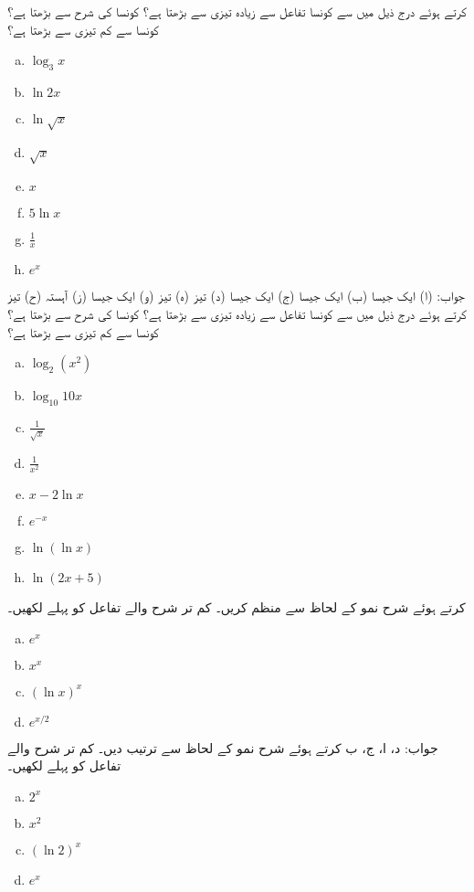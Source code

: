  کرتے ہوئے درج ذیل میں سے کونسا تفاعل  سے زیادہ تیزی سے بڑھتا ہے؟ کونسا  کی شرح سے بڑھتا ہے؟  کونسا  سے کم تیزی سے بڑھتا ہے؟
\begin{multicols}{4}
\begin{enumerate}[a.]
\item
$\log_3x$
\item
$\ln 2x$
\item
$\ln \sqrt{x}$
\item
$\sqrt{x}$
\item
$x$
\item
$5\ln x$
\item
$\frac{1}{x}$
\item
$e^x$
\end{enumerate}
\end{multicols}
جواب:\quad
(ا) ایک جیسا (ب) ایک جیسا (ج) ایک جیسا (د) تیز (ہ) تیز (و) ایک جیسا (ز) آہستہ (ح) تیز 
 کرتے ہوئے درج ذیل میں سے کونسا تفاعل  سے زیادہ تیزی سے بڑھتا ہے؟ کونسا  کی شرح سے بڑھتا ہے؟  کونسا  سے کم تیزی سے بڑھتا ہے؟
\begin{multicols}{4}
\begin{enumerate}[a.]
\item
$\log_2(x^2)$
\item
$\log_{10}10x$
\item
$\frac{1}{\sqrt{x}}$
\item
$\frac{1}{x^2}$
\item
$x-2\ln x$
\item
$e^{-x}$
\item
$\ln(\ln x)$
\item
$\ln(2x+5)$
\end{enumerate}
\end{multicols}

 کرتے ہوئے شرح نمو کے لحاظ سے منظم کریں۔ کم تر شرح والے تفاعل کو پہلے لکھیں۔ 
\begin{multicols}{4}
\begin{enumerate}[a.]
\item
$e^x$
\item
$x^x$
\item
$(\ln x)^x$
\item
$e^{x/2}$
\end{enumerate}
\end{multicols}
جواب:\quad
د، ا، ج، ب
 کرتے ہوئے شرح نمو کے لحاظ سے ترتیب دیں۔ کم تر شرح والے تفاعل کو پہلے لکھیں۔ 
\begin{multicols}{4}
\begin{enumerate}[a.]
\item
$2^x$
\item
$x^2$
\item
$(\ln 2)^x$
\item
$e^x$
\end{enumerate}
\end{multicols}

